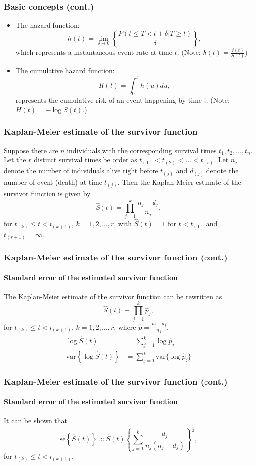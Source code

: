 \documentclass{beamer}
\begin{document}
	\begin{frame}
		\frametitle{Basic concepts (cont.)}
		\begin{itemize}
			\item The hazard function: 
			\[ h(t) = \lim_{  \delta \rightarrow 0 }\left\{ \frac{ P( t \leq T < t + \delta | T \geq t ) }{ \delta } \right\}, \]
			which represents a instantaneous event rate at time $t$. 
			(Note: $ h( t ) = \frac{ f( t ) }{ S( t ) }$)
			\item The cumulative hazard function:
			\[ H( t ) = \int_{ 0 }^{ t } h( u ) du, \]
			represents the cumulative risk of an event happening by time $t$.
			(Note: $H( t ) = - \log S( t )$.) 
		\end{itemize}
	\end{frame}
	
	\begin{frame}
		\frametitle{Kaplan-Meier estimate of the survivor function}
		Suppose there are $n$ individuals with the corresponding survival times $t_1, t_2, \dots, t_n$. Let the $r$ distinct survival times be order as $t_{ ( 1 ) } < t_{ ( 2 ) } < \dots < t_{ ( r ) }$. Let $n_j$ denote the number of individuals alive right before $t_{ ( j ) }$ and $d_{ ( j ) }$ denote the number of event (death) at time $t_{ ( j ) }$. Then the Kaplan-Meier estimate of the survivor function is given by
		\[ \hat{ S }( t ) = \prod_{ j = 1 }^{ k } \frac{ n_j - d_j }{ n_j }, \]
		for $t_{ ( k ) } \leq t < t_{ ( k + 1 ) }$, $k = 1, 2, \dots, r$, with $\hat{ S }( t ) = 1$ for $t < t_{ ( 1 ) }$ and $ t_{ ( r + 1 ) } = \infty$.
			
	\end{frame}
	
	\begin{frame}
		\frametitle{Kaplan-Meier estimate of the survivor function (cont.)}
		\framesubtitle{Standard error of the estimated survivor function}
		The Kaplan-Meier estimate of the survivor function can be rewritten as 
		\[ \hat{ S }( t ) = \prod_{ j = 1 }^{ k } \hat{ p }_j, \]
		for $t_{ ( k ) } \leq t < t_{ ( k + 1 ) }$, $k = 1, 2, \dots, r$, where $\hat{ p } = \frac{ n_j - d_j }{ n_j }$.
		\begin{align*}
			\log \hat{ S }( t ) & = \sum_{ j = 1 }^{ k } \log \hat{ p }_j \\
			\text{var}\left\{ \log \hat{ S }( t ) \right\} & = \sum_{ j = 1 }^{ k } \text{var} \{ \log \hat{ p }_j \}
		\end{align*}
	\end{frame}

	\begin{frame}
		\frametitle{Kaplan-Meier estimate of the survivor function (cont.)}
		\framesubtitle{Standard error of the estimated survivor function}
		It can be shown that 
		\[ \text{se}\left\{ \hat{ S }( t ) \right\} \approx \hat{ S }( t ) \left\{ \sum_{ j = 1 }^{ k } \frac{ d_j }{ n_j ( n_j - d_j ) }  \right\} ^ \frac{ 1 }{ 2 }, \]
		for $t_{ ( k ) } \leq t < t_{ ( k + 1 ) }$.
	\end{frame}
\end{document}
